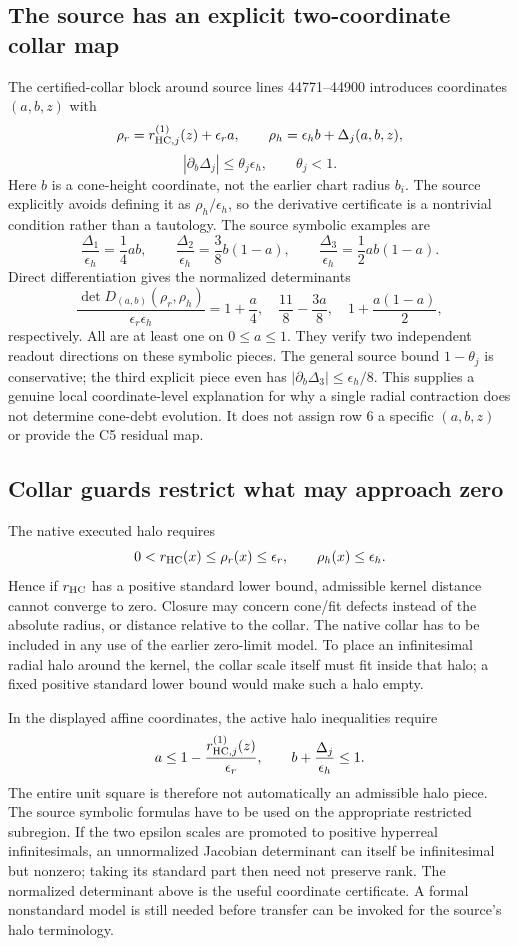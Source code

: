 \documentclass[11pt,a4paper]{article}
\begin{document}
\subsection{The source has an explicit two-coordinate collar map}
The certified-collar block around source lines 44771--44900 introduces
coordinates $(a,b,z)$ with
\[
\rho_r=r_{{\rm HC},j}^{(1)}(z)+\epsilon_r a,
\qquad \rho_h=\epsilon_h b+\Delta_j(a,b,z),
\]
\[
|\partial_b\Delta_j|\le\theta_j\epsilon_h,
\qquad\theta_j<1.
\]
Here $b$ is a cone-height coordinate, not the earlier chart radius $b_i$.
The source explicitly avoids defining it as $\rho_h/\epsilon_h$, so the
derivative certificate is a nontrivial condition rather than a tautology.
The source symbolic examples are
\[
\frac{\Delta_1}{\epsilon_h}=\frac14ab,\qquad
\frac{\Delta_2}{\epsilon_h}=\frac38b(1-a),\qquad
\frac{\Delta_3}{\epsilon_h}=\frac12ab(1-a).
\]
Direct differentiation gives the normalized determinants
\[
\frac{\det D_{(a,b)}(\rho_r,\rho_h)}{\epsilon_r\epsilon_h}
=1+\frac a4,\quad
\frac{11}{8}-\frac{3a}{8},\quad
1+\frac{a(1-a)}2,
\]
respectively. All are at least one on $0\le a\le1$.
They verify two independent readout directions on these symbolic pieces.
The general source bound $1-\theta_j$ is conservative; the third explicit
piece even has $|\partial_b\Delta_3|\le\epsilon_h/8$.
This supplies a genuine local coordinate-level explanation for why a
single radial contraction does not determine cone-debt evolution.
It does not assign row 6 a specific $(a,b,z)$ or provide the C5 residual map.

\subsection{Collar guards restrict what may approach zero}
The native executed halo requires
\[
0<r_{\rm HC}(x)\le\rho_r(x)\le\epsilon_r,
\qquad\rho_h(x)\le\epsilon_h.
\]
Hence if $r_{\rm HC}$ has a positive standard lower bound, admissible
kernel distance cannot converge to zero. Closure may concern cone/fit
defects instead of the absolute radius, or distance relative to the collar.
The native collar has to be included in any use of the earlier zero-limit
model. To place an infinitesimal radial halo around the kernel, the collar
scale itself must fit inside that halo; a fixed positive standard lower
bound would make such a halo empty.

In the displayed affine coordinates, the active halo inequalities require
\[
a\le1-\frac{r_{{\rm HC},j}^{(1)}(z)}{\epsilon_r},
\qquad b+\frac{\Delta_j}{\epsilon_h}\le1.
\]
The entire unit square is therefore not automatically an admissible halo
piece. The source symbolic formulas have to be used on the appropriate
restricted subregion. If the two epsilon scales are promoted to positive
hyperreal infinitesimals, an unnormalized Jacobian determinant can itself
be infinitesimal but nonzero; taking its standard part then need not
preserve rank. The normalized determinant above is the useful coordinate
certificate. A formal nonstandard model is still needed before transfer
can be invoked for the source's halo terminology.
\end{document}
